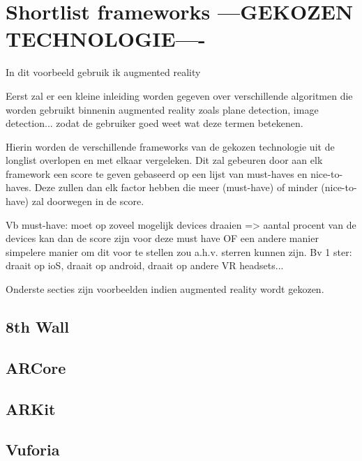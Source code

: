 \chapter{Shortlist frameworks ---GEKOZEN TECHNOLOGIE----}
\label{ch:shortlist}

In dit voorbeeld gebruik ik augmented reality

Eerst zal er een kleine inleiding worden gegeven over verschillende algoritmen die worden gebruikt binnenin augmented reality zoals plane detection, image detection... zodat de gebruiker goed weet wat deze termen betekenen.

Hierin worden de verschillende frameworks van de gekozen technologie uit de longlist overlopen en met elkaar vergeleken. Dit zal gebeuren door aan elk framework een score te geven gebaseerd op een lijst van must-haves en nice-to-haves. Deze zullen dan elk factor hebben die meer (must-have) of minder (nice-to-have) zal doorwegen in de score.

Vb must-have: moet op zoveel mogelijk devices draaien => aantal procent van de devices kan dan de score zijn voor deze must have
OF
een andere manier simpelere manier om dit voor te stellen zou a.h.v. sterren kunnen zijn. Bv 1 ster: draait op ioS, draait op android, draait op andere VR headsets...

Onderste secties zijn voorbeelden indien augmented reality wordt gekozen.

\section{8th Wall}
\section{ARCore}
\section{ARKit}
\section{Vuforia}